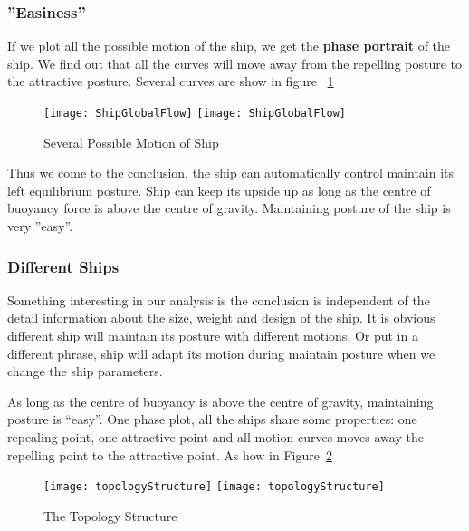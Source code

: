 \subsubsection*{''Easiness''}
If we plot all the possible motion of the ship, we get the \textbf{phase portrait} of the ship. 
We find out that all the curves will move away from the repelling posture to the attractive posture.
 Several curves are show in figure ~\ref{fig:globalflow}
\begin{figure}[!htbp]
  \begin{center}
    \leavevmode
    \ifpdf
      \texttt{[image: ShipGlobalFlow]}
    \else
      \texttt{[image: ShipGlobalFlow]}
    \fi
    \caption{Several Possible Motion of Ship}
    \label{fig:globalflow}
  \end{center}
\end{figure}

Thus we come to the conclusion, the ship can automatically control maintain its left equilibrium posture. 
Ship can keep its upside up as long as the centre of buoyancy force is above the centre of gravity.
Maintaining posture of the ship is very ”easy”.


\subsubsection*{Different Ships} 
Something interesting in our analysis is the conclusion is independent of the detail information about the size, weight and design of the ship. 
It is obvious different ship will maintain its posture with different motions. 
Or put in a different phrase, ship will adapt its motion during maintain posture when we change the ship  parameters.

As long as the centre of buoyancy is above the centre of gravity, maintaining posture is “easy”.
One phase plot, all the ships share some properties: one repealing point, one attractive point and all motion curves moves away the repelling point to the attractive point. As how in Figure~\ref{fig:topologyStructure}

\begin{figure}[!htbp]
  \begin{center}
    \leavevmode
    \ifpdf
      \texttt{[image: topologyStructure]}
    \else
      \texttt{[image: topologyStructure]}
    \fi
    \caption{The Topology Structure}
    \label{fig:topologyStructure}
  \end{center}
\end{figure}


